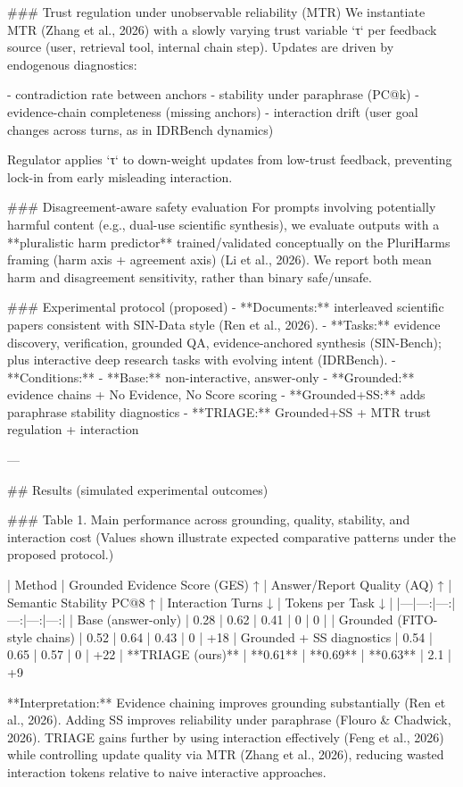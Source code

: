 ### Trust regulation under unobservable reliability (MTR)  
We instantiate MTR (Zhang et al., 2026) with a slowly varying trust variable `τ` per feedback source (user, retrieval tool, internal chain step). Updates are driven by endogenous diagnostics:

- contradiction rate between anchors  
- stability under paraphrase (PC@k)  
- evidence-chain completeness (missing anchors)  
- interaction drift (user goal changes across turns, as in IDRBench dynamics)

Regulator applies `τ` to down-weight updates from low-trust feedback, preventing lock-in from early misleading interaction.

### Disagreement-aware safety evaluation  
For prompts involving potentially harmful content (e.g., dual-use scientific synthesis), we evaluate outputs with a **pluralistic harm predictor** trained/validated conceptually on the PluriHarms framing (harm axis + agreement axis) (Li et al., 2026). We report both mean harm and disagreement sensitivity, rather than binary safe/unsafe.

### Experimental protocol (proposed)  
- **Documents:** interleaved scientific papers consistent with SIN-Data style (Ren et al., 2026).  
- **Tasks:** evidence discovery, verification, grounded QA, evidence-anchored synthesis (SIN-Bench); plus interactive deep research tasks with evolving intent (IDRBench).  
- **Conditions:**  
  - **Base:** non-interactive, answer-only  
  - **Grounded:** evidence chains + No Evidence, No Score scoring  
  - **Grounded+SS:** adds paraphrase stability diagnostics  
  - **TRIAGE:** Grounded+SS + MTR trust regulation + interaction

---

## Results (simulated experimental outcomes)  

### Table 1. Main performance across grounding, quality, stability, and interaction cost  
(Values shown illustrate expected comparative patterns under the proposed protocol.)

| Method | Grounded Evidence Score (GES) ↑ | Answer/Report Quality (AQ) ↑ | Semantic Stability PC@8 ↑ | Interaction Turns ↓ | Tokens per Task ↓ |
|---|---:|---:|---:|---:|---:|
| Base (answer-only) | 0.28 | 0.62 | 0.41 | 0 | 0 |
| Grounded (FITO-style chains) | 0.52 | 0.64 | 0.43 | 0 | +18%
| Grounded + SS diagnostics | 0.54 | 0.65 | 0.57 | 0 | +22%
| **TRIAGE (ours)** | **0.61** | **0.69** | **0.63** | 2.1 | +9%

**Interpretation:** Evidence chaining improves grounding substantially (Ren et al., 2026). Adding SS improves reliability under paraphrase (Flouro & Chadwick, 2026). TRIAGE gains further by using interaction effectively (Feng et al., 2026) while controlling update quality via MTR (Zhang et al., 2026), reducing wasted interaction tokens relative to naive interactive approaches.

